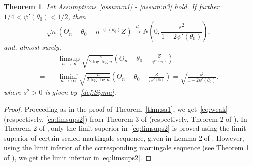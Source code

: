 \documentclass[12pt]{amsart}
\theoremstyle{plain}
\newtheorem{theorem}{Theorem}[section]
\theoremstyle{remark}
\numberwithin{equation}{section}
\begin{document}
\begin{theorem} \label{thm:weak0}
Let Assumptions~\ref{assum:n1} - \ref{assum:n3} hold. If further
$1/4 < \psi'(\theta_0) < 1/2$, then
\begin{equation} \label{eq:weak}
    \sqrt{n}\left(\Theta_n - \theta_0 - n^{-\psi'(\theta_0)}Z\right) \stackrel{d}{\to} N\left(0, \frac{s^2}{1-2\psi'(\theta_0)}\right),
\end{equation}
and, almost surely,
\begin{align}\label{eq:limsups2}
 &\limsup_{n\to \infty} \sqrt{\frac{n}{2\log\log n}}\left(\Theta_n - \theta_0 - \frac{Z}{n^{\psi'(\theta_0)}}\right) \nonumber %
\\ =-& \liminf_{n\to \infty} \sqrt{\frac{n}{2\log\log n}}\left(\Theta_n - \theta_0 - \frac{Z}{n^{\psi'(\theta_0)}}\right)=  \sqrt{\frac{s^2}{1-2 \psi'(\theta_0)}},%
\end{align}
 where $s^2 > 0$ is given by~\eqref{def:Sigma}.
\end{theorem}
\begin{proof}
{Proceeding as in the proof of Theorem~\ref{thm:sa1}, we get~\eqref{eq:weak} (respectively, \eqref{eq:limsups2}) from Theorem 3 of \cite{major1973limit} (respectively, Theorem 2 of \cite{krasulina1996estimate}). In Theorem 2 of \cite{krasulina1996estimate}, only the limit superior in~\eqref{eq:limsups2} is proved using the limit superior of certain scaled martingale sequence, given in Lemma 2 of \cite{krasulina1996estimate}. However, using the limit inferior of the corresponding martingale sequence (see Theorem 1 of \cite{heyde}), we get the limit inferior in \eqref{eq:limsups2}}.
\end{proof}
\end{document}

